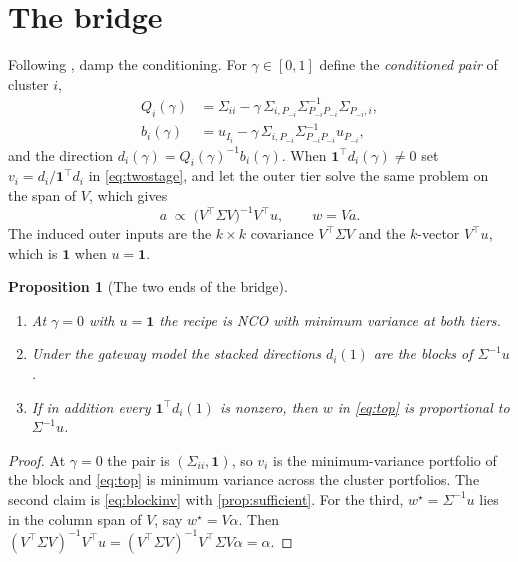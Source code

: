 \documentclass[11pt]{article}
\newcommand{\ones}{\mathbf{1}}
\newtheorem{proposition}{Proposition}
\begin{document}
\section{The bridge}

Following \textcite{cotton2024schur}, damp the conditioning. For
$\gamma\in[0,1]$ define the \emph{conditioned pair} of cluster $i$,
\begin{equation}
\begin{aligned}
  Q_i(\gamma) &= \Sigma_{ii}-\gamma\,\Sigma_{i,P_{-i}}\Sigma_{P_{-i}P_{-i}}^{-1}\Sigma_{P_{-i},i},\\
  b_i(\gamma) &= u_{I_i}-\gamma\,\Sigma_{i,P_{-i}}\Sigma_{P_{-i}P_{-i}}^{-1}u_{P_{-i}},
\end{aligned}
  \label{eq:pair}
\end{equation}
and the direction $d_i(\gamma)=Q_i(\gamma)^{-1}b_i(\gamma)$. When
$\ones^\top d_i(\gamma)\neq0$ set $v_i=d_i/\ones^\top d_i$ in
\eqref{eq:twostage}, and let the outer tier solve the same problem on the
span of $V$, which gives
\begin{equation}
  a \;\propto\; \big(V^\top\Sigma V\big)^{-1}V^\top u,
  \qquad w = Va .
  \label{eq:top}
\end{equation}
The induced outer inputs are the $k\times k$ covariance $V^\top\Sigma V$
and the $k$-vector $V^\top u$, which is $\ones$ when $u=\ones$.

\begin{proposition}[The two ends of the bridge]
\label{prop:bridge}
\leavevmode
\begin{enumerate}
\item At $\gamma=0$ with $u=\ones$ the recipe is NCO with minimum variance
  at both tiers.
\item Under the gateway model the stacked directions $d_i(1)$ are the blocks
  of $\Sigma^{-1}u$.
\item If in addition every $\ones^\top d_i(1)$ is nonzero, then $w$ in
  \eqref{eq:top} is proportional to $\Sigma^{-1}u$.
\end{enumerate}
\end{proposition}

\begin{proof}
At $\gamma=0$ the pair is $(\Sigma_{ii},\ones)$, so $v_i$ is the
minimum-variance portfolio of the block and \eqref{eq:top} is minimum
variance across the cluster portfolios. The second claim is
\eqref{eq:blockinv} with \cref{prop:sufficient}. For the third,
$w^\star=\Sigma^{-1}u$ lies in the column span of $V$, say
$w^\star=V\alpha$. Then
$(V^\top\Sigma V)^{-1}V^\top u
=(V^\top\Sigma V)^{-1}V^\top\Sigma V\alpha=\alpha$.
\end{proof}
\end{document}
